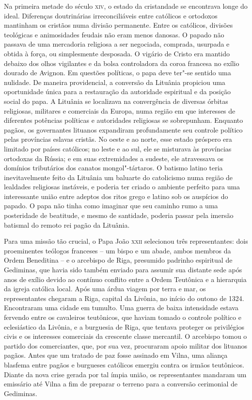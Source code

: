 Na primeira metade do século \textsc{xiv}, o estado da cristandade se encontrava
longe do ideal. Diferenças doutrinárias irreconciliáveis entre católicos
e ortodoxos mantinham os cristãos numa divisão permanente. Entre os
católicos, divisões teológicas e animosidades feudais não eram menos
danosas. O papado não passava de uma mercadoria religiosa a ser
negociada, comprada, usurpada e obtida à força, ou simplesmente
desposada. O vigário de Cristo era mantido debaixo dos olhos vigilantes
e da bolsa controladora da coroa francesa no exílio dourado de Avignon.
Em questões políticas, o papa deve ter"-se sentido uma nulidade. De
maneira providencial, a conversão da Lituânia propiciou uma oportunidade
única para a restauração da autoridade espiritual e da posição social do
papa. A Lituânia se localizava na convergência de diversas órbitas
religiosas, militares e comerciais da Europa, numa região em que
interesses de diferentes potências políticas e autoridades religiosas se
sobrepunham. Enquanto pagãos, os governantes lituanos expandiram
profundamente seu controle político pelas províncias eslavas cristãs. No
oeste e ao norte, esse estado próspero era limitado por países
católicos; no leste e ao sul, ele se misturava às províncias ortodoxas
da Rússia; e em suas extremidades a sudeste, ele atravessava os domínios
tributários dos canatos mongol"-tártaros. O batismo latino teria
inevitavelmente feito da Lituânia um baluarte do catolicismo numa região
de lealdades religiosas instáveis, e poderia ter criado o ambiente
perfeito para uma interessante união entre adeptos dos ritos grego e
latino sob os auspícios do papado. O papa não tinha como imaginar que
seu caminho rumo a uma posteridade de beatitude, e mesmo de santidade,
poderia passar pela imersão batismal do remoto rei pagão da Lituânia.

Para uma missão tão crucial, o Papa João \textsc{xxii} selecionou três
representantes: dois proeminentes teólogos franceses -- um bispo e um
abade, ambos membros da Ordem Beneditina -- e o arcebispo de Riga,
presumido padrinho espiritual de Gediminas, que havia sido também
enviado para assumir sua distante sede após anos de exílio devido ao
contínuo conflito entre a Ordem Teutônica e a hierarquia da igreja
católica local. Após uma árdua viagem por terra e mar, os representantes
chegaram a Riga, capital da Livônia, no início do outono de 1324.
Encontraram uma cidade em tumulto. Uma guerra de baixa intensidade
estava fervendo entre os cavaleiros teutônicos, que haviam tomado o
controle político e eclesiástico da Livônia, e a burguesia de Riga, que
tentava proteger os privilégios civis e os interesses comerciais da
crescente classe mercantil. O arcebispo tomou o partido dos
comerciantes, que, por sua vez, procuraram apoio militar dos lituanos
pagãos. Antes que um tratado de paz fosse assinado em Vilna, uma aliança
blasfema entre pagãos e burgueses católicos emergiu contra os irmãos
teutônicos. Diante da nova crise gerada por tal ímpia união, os
representantes mandaram um emissário até Vilna a fim de preparar o
terreno para a conversão cerimonial de Gediminas.

